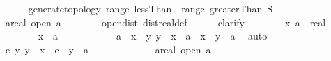 \begin{isabellebody}
\ \ \ \ \isamarkupfalse%
\ {\isachardoublequoteopen}generate{\isacharunderscore}{\kern0pt}topology\ {\isacharparenleft}{\kern0pt}range\ lessThan\ {\isasymunion}\ range\ greaterThan{\isacharparenright}{\kern0pt}\ S{\isachardoublequoteclose}\isanewline
\ \ \ \ \isamarkupfalse%
\ \isamarkupfalse%
\ {\isachardoublequoteopen}{\isasymAnd}a{\isacharcolon}{\kern0pt}{\isacharcolon}{\kern0pt}real{\isachardot}{\kern0pt}\ open\ {\isacharbraceleft}{\kern0pt}{\isachardot}{\kern0pt}{\isachardot}{\kern0pt}{\isacharless}{\kern0pt}a{\isacharbraceright}{\kern0pt}{\isachardoublequoteclose}\isanewline
\ \ \ \ \ \ \isamarkupfalse%
\ open{\isacharunderscore}{\kern0pt}dist\ dist{\isacharunderscore}{\kern0pt}real{\isacharunderscore}{\kern0pt}def\isanewline
\ \ \ \ \isamarkupfalse%
\ clarify\isanewline
\ \ \ \ \ \ \isamarkupfalse%
\ x\ a\ {\isacharcolon}{\kern0pt}{\isacharcolon}{\kern0pt}\ real\isanewline
\ \ \ \ \ \ \isamarkupfalse%
\ {\isachardoublequoteopen}x\ {\isacharless}{\kern0pt}\ a{\isachardoublequoteclose}\isanewline
\ \ \ \ \ \ \isamarkupfalse%
\ \isamarkupfalse%
\ {\isachardoublequoteopen}{}\ {\isacharless}{\kern0pt}\ a\ {\isacharminus}{\kern0pt}\ x\ {\isasymand}\ {\isacharparenleft}{\kern0pt}{\isasymforall}y{\isachardot}{\kern0pt}\ {\isasymbar}y\ {\isacharminus}{\kern0pt}\ x{\isasymbar}\ {\isacharless}{\kern0pt}\ a\ {\isacharminus}{\kern0pt}\ x\ {\isasymlongrightarrow}\ y\ {\isasymin}\ {\isacharbraceleft}{\kern0pt}{\isachardot}{\kern0pt}{\isachardot}{\kern0pt}{\isacharless}{\kern0pt}a{\isacharbraceright}{\kern0pt}{\isacharparenright}{\kern0pt}{\isachardoublequoteclose}\ \isamarkupfalse%
\ auto\isanewline
\ \ \ \ \ \ \isamarkupfalse%
\ \isamarkupfalse%
\ {\isachardoublequoteopen}{\isasymexists}e{\isachargreater}{\kern0pt}{}{\isachardot}{\kern0pt}\ {\isasymforall}y{\isachardot}{\kern0pt}\ {\isasymbar}y\ {\isacharminus}{\kern0pt}\ x{\isasymbar}\ {\isacharless}{\kern0pt}\ e\ {\isasymlongrightarrow}\ y\ {\isasymin}\ {\isacharbraceleft}{\kern0pt}{\isachardot}{\kern0pt}{\isachardot}{\kern0pt}{\isacharless}{\kern0pt}a{\isacharbraceright}{\kern0pt}{\isachardoublequoteclose}\ \isacommand{{\isachardot}{\kern0pt}{\isachardot}{\kern0pt}}\isamarkupfalse%
\isanewline
\ \ \ \ \isamarkupfalse%
\isanewline
\ \ \ \ \isamarkupfalse%
\ \isamarkupfalse%
\ {\isachardoublequoteopen}{\isasymAnd}a{\isacharcolon}{\kern0pt}{\isacharcolon}{\kern0pt}real{\isachardot}{\kern0pt}\ open\ {\isacharbraceleft}{\kern0pt}a\ {\isacharless}{\kern0pt}{\isachardot}{\kern0pt}{\isachardot}{\kern0pt}{\isacharbraceright}{\kern0pt}{\isachardoublequoteclose}\isanewline

\end{isabellebody}
